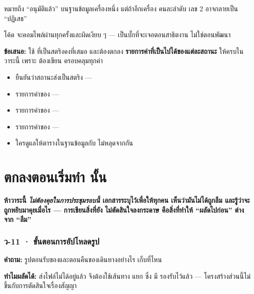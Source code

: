 \begin{badbox}[title={ส่งเลข \en{primary key} ของสถานะออกไป = บั๊กที่จะโผล่ตอนย้ายเครื่อง}]
 หมายถึง ``อนุมัติแล้ว'' บนฐานข้อมูลเครื่องหนึ่ง
แต่ถ้าอีกเครื่อง  คนละลำดับ เลข 2 อาจกลายเป็น ``ปฏิเสธ''

โค้ด  จะคอมไพล์ผ่านทุกครั้งและผิดเงียบ ๆ ---
เป็นบั๊กที่จะเจอตอนสาธิตงาน ไม่ใช่ตอนพัฒนา
\end{badbox}

\textbf{ข้อเสนอ:}  ใช้  ที่เป็นสตริงคงที่เสมอ
และต้องตกลง \textbf{รายการค่าที่เป็นไปได้ของแต่ละสถานะ} ให้ครบในวาระนี้ เพราะ
 ต้องเขียน  ครอบคลุมทุกค่า

\begin{outbox}
\begin{itemize}
\item ยืนยันว่าสถานะส่งเป็นสตริง ---
\item รายการค่าของ  ---
\item รายการค่าของ  ---
\item รายการค่าของ  ---
\item ใครดูแลให้ตารางในฐานข้อมูลกับ  ไม่หลุดจากกัน
\end{itemize}
\end{outbox}

\clearpage

\part{\ptwo{} ตกลงตอนเริ่มทำ  นั้น}

\textbf{ห้าวาระนี้ \emph{ไม่ต้องคุยในการประชุมรอบนี้} เอกสารระบุไว้เพื่อให้ทุกคน
เห็นว่ามันไม่ได้ถูกลืม และรู้ว่าจะถูกหยิบมาคุยเมื่อไร --- การเขียนสิ่งที่ยัง
ไม่ตัดสินใจลงกระดาษ คือสิ่งที่ทำให้ ``ผลัดไปก่อน'' ต่างจาก ``ลืม''}

\section{ว-11 · ขั้นตอนการอัปโหลดรูป}

\textbf{คำถาม:} รูปตอนรับของและตอนคืนของเดินทางอย่างไร เก็บที่ไหน

\textbf{ทำไมผลัดได้:}  ส่งไฟล์ไม่ได้อยู่แล้ว จึงต้องใช้เส้นทาง
 แยก ซึ่ง  มี  รองรับไว้แล้ว
--- โครงสร้างส่วนนี้ไม่ขึ้นกับการตัดสินใจเรื่องสัญญา

